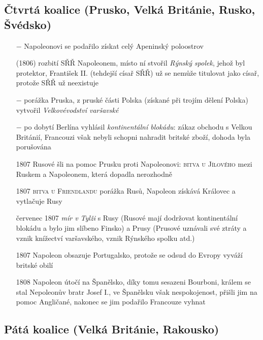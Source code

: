 \documentclass{article}
\begin{document}
\subsection*{Čtvrtá koalice (Prusko, Velká Británie, Rusko, Švédsko)}
\begin{itemize}
    \vspace{-0.5em}
    \setlength\itemsep{0.15em}
    \item[$-$] Napoleonovi se podařilo získat celý Apeninský poloostrov
    \item[(1806)] rozbití SŘŘ Napoleonem, místo ní stvořil \textit{Rýnský spolek}, jehož byl protektor, František II. (tehdejší císař SŘŘ) už se nemůže titulovat jako císař, protože SŘŘ už neexistuje
    \item[$-$] porážka Pruska, z pruské části Polska (získané při trojím dělení Polska) vytvořil \textit{Velkovévodství varšavské}
    \item[$-$] po dobytí Berlína vyhlásil \textit{kontinentální blokádu}: zákaz obchodu s Velkou Británií, Francouzi však nebyli schopni nahradit britské zboží, dohoda byla porušována
    \item[1807] Rusové šli na pomoc Prusku proti Napoleonovi: \textsc{bitva u Jílového} mezi Ruskem a Napoleonem, která dopadla nerozhodně
    \item[1807] \textsc{bitva u Friendlandu} porážka Rusů, Napoleon získává Královec a vytlačuje Rusy
    \item[červenec 1807] \textit{mír v Tylži} s Rusy (Rusové mají dodržovat kontinentální blokádu a bylo jim slíbeno Finsko) a Prusy (Prusové uznávali své ztráty a vznik knížectví varšavského, vznik Rýnského spolku atd.)
    \item[1807] Napoleon obsazuje Portugalsko, protože se odsud do Evropy vyváží britské obilí
    \item[1808] Napoleon útočí na Španělsko, díky tomu sesazeni Bourboni, králem se stal Nepoleonův bratr Josef I., ve Španělsku však nespokojenost, přišli jim na pomoc Angličané, nakonec se jim podařilo Francouze vyhnat
\end{itemize}

\subsection*{Pátá koalice (Velká Británie, Rakousko)}
\end{document}
